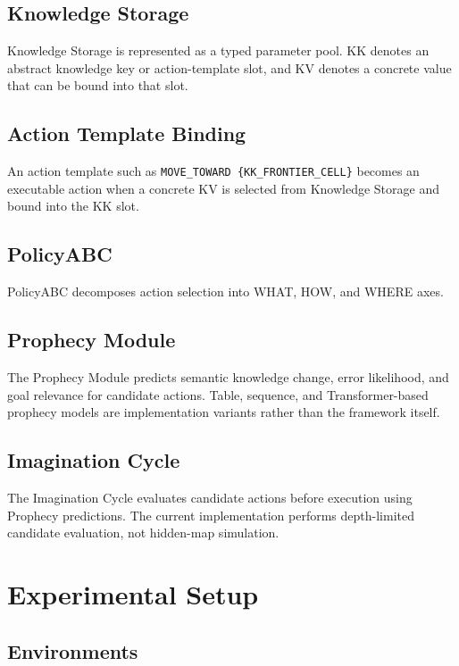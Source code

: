\documentclass[conference]{IEEEtran}
\begin{document}
\subsection{Knowledge Storage}

Knowledge Storage is represented as a typed parameter pool. KK denotes an
abstract knowledge key or action-template slot, and KV denotes a concrete value
that can be bound into that slot.

\subsection{Action Template Binding}

An action template such as \texttt{MOVE\_TOWARD \{KK\_FRONTIER\_CELL\}} becomes
an executable action when a concrete KV is selected from Knowledge Storage and
bound into the KK slot.

\subsection{PolicyABC}

PolicyABC decomposes action selection into WHAT, HOW, and WHERE axes.

\subsection{Prophecy Module}

The Prophecy Module predicts semantic knowledge change, error likelihood, and
goal relevance for candidate actions. Table, sequence, and Transformer-based
prophecy models are implementation variants rather than the framework itself.

\subsection{Imagination Cycle}

The Imagination Cycle evaluates candidate actions before execution using
Prophecy predictions. The current implementation performs depth-limited
candidate evaluation, not hidden-map simulation.

\section{Experimental Setup}

\subsection{Environments}
\end{document}
